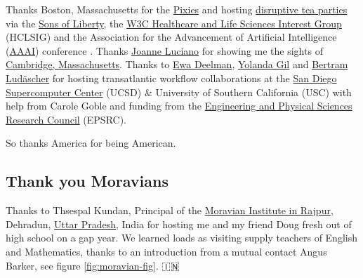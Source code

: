 \documentclass[
]{book}
\begin{document}
Thanks Boston, Massachusetts for the \href{https://en.wikipedia.org/wiki/Pixies_(band)}{Pixies} and hosting \href{https://en.wikipedia.org/wiki/Boston_Tea_Party}{disruptive tea parties} via the \href{https://en.wikipedia.org/wiki/Sons_of_Liberty}{Sons of Liberty}, the \href{https://www.w3.org/wiki/HCLSIG}{W3C Healthcare and Life Sciences Interest Group} (HCLSIG) and the Association for the Advancement of Artificial Intelligence (\href{https://en.wikipedia.org/wiki/Association_for_the_Advancement_of_Artificial_Intelligence}{AAAI}) conference \citep{aaai}. Thanks \href{https://scholar.google.com/citations?user=wWYH1IMAAAAJ}{Joanne Luciano} for showing me the sights of \href{https://en.wikipedia.org/wiki/Cambridge,_Massachusetts}{Cambridge, Massachusetts}. Thanks to \href{https://en.wikipedia.org/wiki/Ewa_Deelman}{Ewa Deelman}, \href{https://en.wikipedia.org/wiki/Yolanda_Gil}{Yolanda Gil} and \href{https://ischool.illinois.edu/people/bertram-ludascher}{Bertram Ludäscher} for hosting transatlantic workflow collaborations at the \href{https://en.wikipedia.org/wiki/San_Diego_Supercomputer_Center}{San Diego Supercomputer Center} (UCSD) \& University of Southern California (USC) with help from Carole Goble and funding from the \href{https://en.wikipedia.org/wiki/Engineering_and_Physical_Sciences_Research_Council}{Engineering and Physical Sciences Research Council} (EPSRC).

So thanks America for being American. 🙏

\hypertarget{moravians}{%
\subsection{Thank you Moravians}\label{moravians}}

Thanks to Thsespal Kundan, Principal of the \href{https://moravianinstitute.com/}{Moravian Institute in Rajpur}, Dehradun, \href{https://en.wikipedia.org/wiki/Uttar_Pradesh}{Uttar Pradesh}, India for hosting me and my friend Doug fresh out of high school on a gap year. We learned loads as visiting supply teachers of English and Mathematics, thanks to an introduction from a mutual contact Angus Barker, see figure \ref{fig:moravian-fig}. 🇮🇳
\end{document}
